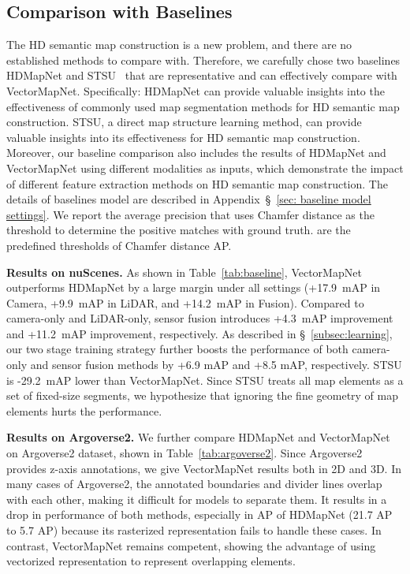 \documentclass{article}
\theoremstyle{plain}
\theoremstyle{definition}
\theoremstyle{remark}
\begin{document}
\subsection{Comparison with Baselines}
\label{sec:baseline}
The HD semantic map construction is a new problem, and there are no established methods to compare with. Therefore, we carefully chose two baselines HDMapNet and STSU~\citep{can2021structured} that are representative and can effectively compare with VectorMapNet. Specifically: HDMapNet can provide valuable insights into the effectiveness of commonly used map segmentation methods for HD semantic map construction. STSU, a direct map structure learning method, can provide valuable insights into its effectiveness for HD semantic map construction. Moreover, our baseline comparison also includes the results of HDMapNet and VectorMapNet using different modalities as inputs, which demonstrate the impact of different feature extraction methods on HD semantic map construction. The details of baselines model are described in Appendix~\S~\ref{sec: baseline model settings}. We report the average precision that uses Chamfer distance as the threshold to determine the positive matches with ground truth.  are the predefined thresholds of Chamfer distance AP. 

\noindent\textbf{Results on nuScenes.} As shown in Table~\ref{tab:baseline}, VectorMapNet outperforms HDMapNet by a large margin under all settings (+17.9~mAP in Camera, +9.9~mAP in LiDAR, and +14.2~mAP in Fusion). Compared to camera-only and LiDAR-only, sensor fusion introduces +4.3~mAP improvement and +11.2~mAP improvement, respectively.
As described in \S~\ref{subsec:learning}, our two stage training strategy further boosts the performance of both camera-only and sensor fusion methods by +6.9 mAP and +8.5 mAP, respectively.
STSU is -29.2~mAP lower than VectorMapNet. Since STSU treats all map elements as a set of fixed-size segments, we hypothesize that ignoring the fine geometry of map elements hurts the performance. 

\noindent\textbf{Results on Argoverse2.} We further compare HDMapNet and VectorMapNet on Argoverse2 dataset, shown in Table~\ref{tab:argoverse2}.
Since Argoverse2 provides z-axis annotations, we give VectorMapNet results both in 2D and 3D.
In many cases of Argoverse2, the annotated boundaries and divider lines overlap with each other, making it difficult for models to separate them. It results in a drop in performance of both methods, especially in AP of HDMapNet (21.7 AP to 5.7 AP) because its rasterized representation fails to handle these cases. In contrast, VectorMapNet remains competent, showing the advantage of using vectorized representation to represent overlapping elements.
\end{document}
